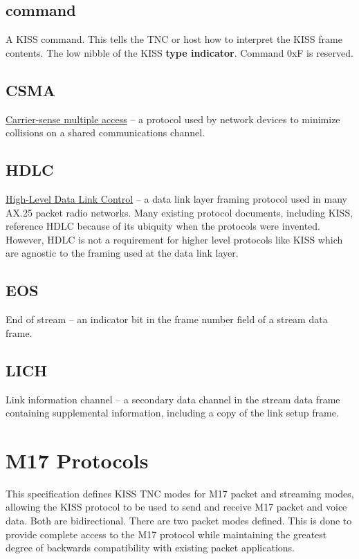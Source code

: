 \documentclass[a4paper,11pt,oneside]{book}
\begin{document}
\subsection{command}

A KISS command. This tells the TNC or host how to interpret the KISS frame contents. The low nibble of the KISS \textbf{type indicator}. Command 0xF is reserved.

\subsection{CSMA}

\href{https://en.wikipedia.org/wiki/Carrier-sense_multiple_access}{Carrier-sense multiple access} -- a protocol used by network devices to minimize collisions on a shared communications channel.

\subsection{HDLC}

\href{https://en.wikipedia.org/wiki/High-Level_Data_Link_Control}{High-Level Data Link Control} -- a data link layer framing protocol used in many AX.25 packet radio networks. Many existing protocol documents, including KISS, reference HDLC because of its ubiquity when the protocols were invented. However, HDLC is not a requirement for higher level protocols like KISS which are agnostic to the framing used at the data link layer.

\subsection{EOS}

End of stream -- an indicator bit in the frame number field of a stream data frame.

\subsection{LICH}

Link information channel -- a secondary data channel in the stream data frame containing supplemental information, including a copy of the link setup frame.

\section{M17 Protocols}

This specification defines KISS TNC modes for M17 packet and streaming modes, allowing the KISS protocol to be used to send and receive M17 packet and voice data. Both are bidirectional. There are two packet modes defined. This is done to provide complete access to the M17 protocol while maintaining the greatest degree of backwards compatibility with existing packet applications.
\end{document}
